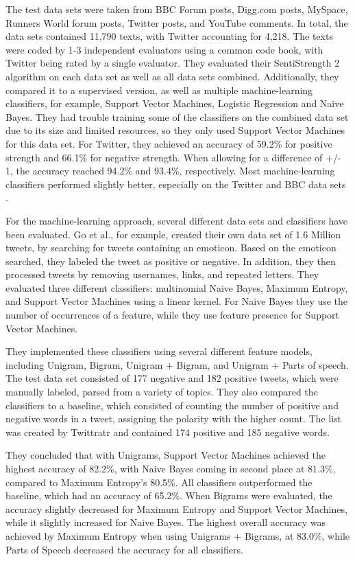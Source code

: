 The test data sets were taken from BBC Forum posts, Digg.com posts, MySpace, Runners World forum posts, Twitter posts, and YouTube comments. In total, the data sets contained 11,790 texts, with Twitter accounting for 4,218. The texts were coded by 1-3 independent evaluators using a common code book, with Twitter being rated by a single evaluator. They evaluated their SentiStrength 2 algorithm on each data set as well as all data sets combined. Additionally, they compared it to a supervised version, as well as multiple machine-learning classifiers, for example, Support Vector Machines, Logistic Regression and Naive Bayes. They had trouble training some of the classifiers on the combined data set due to its size and limited resources, so they only used Support Vector Machines for this data set. For Twitter, they achieved an accuracy of 59.2\% for positive strength and 66.1\% for negative strength. When allowing for a difference of +/- 1, the accuracy reached 94.2\% and 93.4\%, respectively. Most machine-learning classifiers performed slightly better, especially on the Twitter and BBC data sets \cite{10.1002/asi.21662}.

For the machine-learning approach, several different data sets and classifiers have been evaluated. Go et al., for example, created their own data set of 1.6 Million tweets, by searching for tweets containing an emoticon. Based on the emoticon searched, they labeled the tweet as positive or negative. In addition, they then processed tweets by removing usernames, links, and repeated letters. They evaluated three different classifiers: multinomial Naive Bayes, Maximum Entropy, and Support Vector Machines using a linear kernel. For Naive Bayes  they use the number of occurrences of a feature, while they use feature presence for Support Vector Machines. 

They implemented these classifiers using several different feature models, including Unigram, Bigram, Unigram + Bigram, and Unigram + Parts of speech. The test data set consisted of 177 negative and 182 positive tweets, which were manually labeled, parsed from a variety of topics. They also compared the classifiers to a baseline, which consisted of counting the number of positive and negative words in a tweet, assigning the polarity with the higher count. The list was created by Twittratr and contained 174 positive and 185 negative words. 

They concluded that with Unigrams, Support Vector Machines achieved the highest accuracy of 82.2\%, with Naive Bayes coming in second place at 81.3\%, compared to Maximum Entropy's 80.5\%. All classifiers outperformed the baseline, which had an accuracy of 65.2\%. When Bigrams were evaluated, the accuracy slightly decreased for Maximum Entropy and Support Vector Machines, while it slightly increased for Naive Bayes. The highest overall accuracy was achieved by Maximum Entropy when using Unigrams + Bigrams, at 83.0\%, while Parts of Speech decreased the accuracy for all classifiers.

